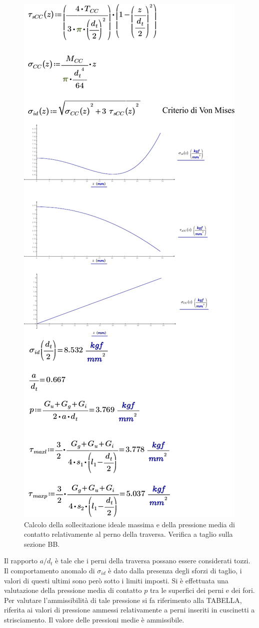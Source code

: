 \begin{figure}[H]
\centering
  \includegraphics[width=.5\textwidth]{imgs/MathTrav2}
\caption{Calcolo della sollecitazione ideale massima e della pressione media di contatto relativamente al perno della traversa. Verifica a taglio sulla sezione BB.}
\label{fig:MathTrav2}
\end{figure}
Il rapporto $a/d_t$ è tale che i perni della traversa possano essere considerati tozzi.
Il comportamento anomalo di $\sigma_{id}$ è dato dalla presenza degli sforzi di taglio, i valori di questi ultimi sono però sotto i limiti imposti. 
Si è effettuata una valutazione della pressione media di contatto $p$ tra le superfici dei perni e dei fori. 
Per valutare l'ammissibilità di tale pressione si fa riferimento alla TABELLA, riferita ai valori di pressione ammessi relativamente a perni inseriti in cuscinetti a strisciamento.
Il valore delle pressioni medie è ammissibile. 

